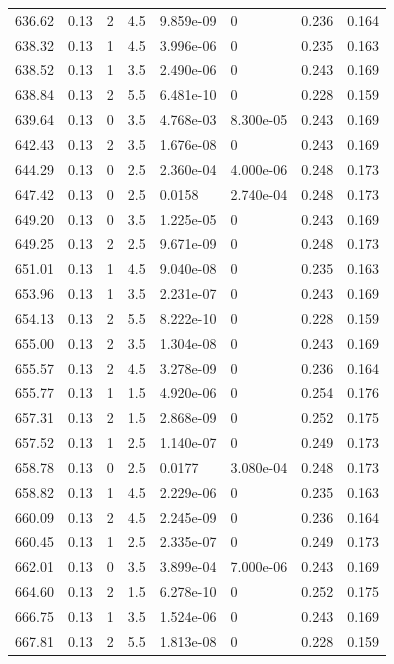 \documentclass[preview]{standalone}
\begin{document}
{{{{{{{{{{{\begin{tabular}{L{1.2cm}C{1.2cm} C{0.3cm}C{0.5cm} C{1.4cm}C{1.4cm} C{1.4cm}C{1.4cm}}
  636.62  &  0.13  & 2     & 4.5 &  9.859e-09  & 0  & 0.236 &  0.164   \\ 
  638.32  &  0.13  & 1     & 4.5 &  3.996e-06  & 0  & 0.235 &  0.163   \\ 
  638.52  &  0.13  & 1     & 3.5 &  2.490e-06  & 0  & 0.243 &  0.169   \\ 
  638.84  &  0.13  & 2     & 5.5 &  6.481e-10  & 0  & 0.228 &  0.159   \\ 
  639.64  &  0.13  & 0     & 3.5 &  4.768e-03  & 8.300e-05  & 0.243 &  0.169   \\ 
  642.43  &  0.13  & 2     & 3.5 &  1.676e-08  & 0  & 0.243 &  0.169   \\ 
  644.29  &  0.13  & 0     & 2.5 &  2.360e-04  & 4.000e-06  & 0.248 &  0.173   \\ 
  647.42  &  0.13  & 0     & 2.5 &  0.0158  & 2.740e-04  & 0.248 &  0.173   \\ 
  649.20  &  0.13  & 0     & 3.5 &  1.225e-05  & 0  & 0.243 &  0.169   \\ 
  649.25  &  0.13  & 2     & 2.5 &  9.671e-09  & 0  & 0.248 &  0.173   \\ 
  651.01  &  0.13  & 1     & 4.5 &  9.040e-08  & 0  & 0.235 &  0.163   \\ 
  653.96  &  0.13  & 1     & 3.5 &  2.231e-07  & 0  & 0.243 &  0.169   \\ 
  654.13  &  0.13  & 2     & 5.5 &  8.222e-10  & 0  & 0.228 &  0.159   \\ 
  655.00  &  0.13  & 2     & 3.5 &  1.304e-08  & 0  & 0.243 &  0.169   \\ 
  655.57  &  0.13  & 2     & 4.5 &  3.278e-09  & 0  & 0.236 &  0.164   \\ 
  655.77  &  0.13  & 1     & 1.5 &  4.920e-06  & 0  & 0.254 &  0.176   \\ 
  657.31  &  0.13  & 2     & 1.5 &  2.868e-09  & 0  & 0.252 &  0.175   \\ 
  657.52  &  0.13  & 1     & 2.5 &  1.140e-07  & 0  & 0.249 &  0.173   \\ 
  658.78  &  0.13  & 0     & 2.5 &  0.0177  & 3.080e-04  & 0.248 &  0.173   \\ 
  658.82  &  0.13  & 1     & 4.5 &  2.229e-06  & 0  & 0.235 &  0.163   \\ 
  660.09  &  0.13  & 2     & 4.5 &  2.245e-09  & 0  & 0.236 &  0.164   \\ 
  660.45  &  0.13  & 1     & 2.5 &  2.335e-07  & 0  & 0.249 &  0.173   \\ 
  662.01  &  0.13  & 0     & 3.5 &  3.899e-04  & 7.000e-06  & 0.243 &  0.169   \\ 
  664.60  &  0.13  & 2     & 1.5 &  6.278e-10  & 0  & 0.252 &  0.175   \\ 
  666.75  &  0.13  & 1     & 3.5 &  1.524e-06  & 0  & 0.243 &  0.169   \\ 
  667.81  &  0.13  & 2     & 5.5 &  1.813e-08  & 0  & 0.228 &  0.159   \\ 
\hline 
\end{tabular} 

}}}}}}}}}}}
\end{document}

